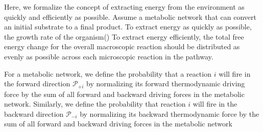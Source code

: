 Here, we formalize the concept of extracting energy from the environment as quickly and efficiently as possible. Assume a metabolic network that can convert an initial substrate to a final product. To extract energy as quickly as possible, the growth rate of the organism()  To extract energy efficiently, the total free energy change for the overall macroscopic reaction should be distributed as evenly as possible across each microscopic reaction in the pathway.


For a metabolic network, we define the probability that a reaction $i$ will fire in the forward  direction ${\mathcal P_{+i}}$ by normalizing its forward thermodynamic driving force by the sum of all forward and backward driving forces in the metabolic network. Similarly, we define the probability that reaction $i$ will fire in the backward direction $\mathcal P_{-i}$ by normalizing its backward thermodynamic force by  the sum of all forward and backward driving forces in the metabolic network